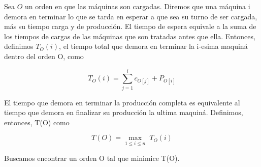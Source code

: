  
Sea $O$ un orden en que las m\'aquinas son cargadas.
Diremos que una m\'aquina i demora en terminar lo que se tarda en esperar a que sea su turno de ser cargada, m\'as su tiempo carga y de producci\'on.
El tiempo de espera equivale a la suma de los tiempos de cargas de las m\'aquinas que son tratadas antes que ella. 
Entonces, definimos $T_{O}(i)$, el tiempo total que demora en terminar la i-esima maquin\'a dentro del orden O, como 
 
$$ T_{O}(i) = \sum_{j = 1}^{i}{c_{O[j]}} + P_{O[i]}$$
 
El tiempo que demora en terminar la producci\'on completa es equivalente al tiempo que demora en finalizar su producci\'on la ultima maquin\'a. Definimos, entonces, T(O) como

$$T(O) = {\displaystyle\max_{1 \leq i \leq n}\;  T_{O}(i)}$$

Buscamos encontrar un orden O tal que minimice T(O).


